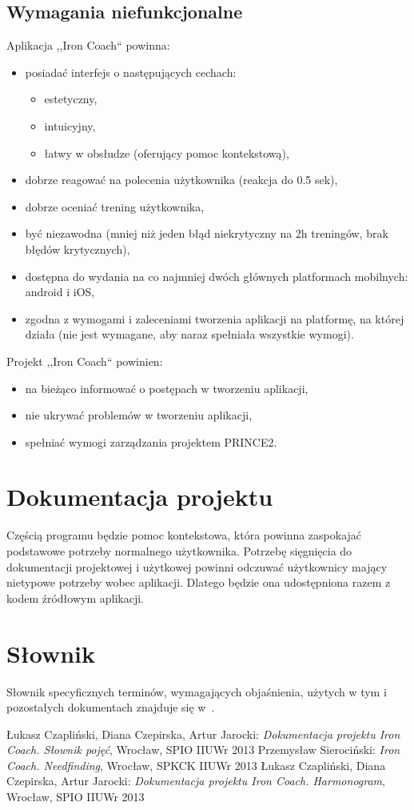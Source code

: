 \subsection{Wymagania niefunkcjonalne}
Aplikacja ,,Iron Coach`` powinna:
\begin{itemize}
  \item posiadać interfejs o następujących cechach:
    \begin{itemize}
      \item estetyczny,
      \item intuicyjny, 
      \item łatwy w obsłudze (oferujący pomoc kontekstową), 
    \end{itemize}
  \item dobrze reagować na polecenia użytkownika (reakcja do 0.5 sek),
  \item dobrze oceniać trening użytkownika,
  \item być niezawodna (mniej niż jeden błąd niekrytyczny na 2h treningów, brak błędów krytycznych),
  \item dostępna do wydania na co najmniej dwóch głównych platformach mobilnych: android i iOS,
  \item zgodna z wymogami i zaleceniami tworzenia aplikacji na platformę, na której działa (nie jest wymagane, aby naraz spełniała wszystkie wymogi).
\end{itemize}
Projekt ,,Iron Coach`` powinien:
\begin{itemize}
  \item na bieżąco informować o postępach w tworzeniu aplikacji,
  \item nie ukrywać problemów w tworzeniu aplikacji,
  \item spełniać wymogi zarządzania projektem PRINCE2.
\end{itemize}
\section{Dokumentacja projektu}
\noindent Częścią programu będzie pomoc kontekstowa, która powinna zaspokajać podstawowe potrzeby normalnego użytkownika. Potrzebę sięgnięcia do dokumentacji projektowej i użytkowej powinni odczuwać użytkownicy mający nietypowe potrzeby wobec aplikacji. Dlatego będzie ona udostępniona razem z kodem źródłowym aplikacji.
\section{Słownik}
\noindent Słownik specyficznych terminów, wymagających objaśnienia, użytych w tym i pozostałych dokumentach znajduje się w~\cite{Sł}.
\begin{thebibliography}{99}
   Łukasz Czapliński, Diana Czepirska, Artur Jarocki: {\it Dokumentacja projektu Iron Coach. Słownik pojęć}, Wrocław, SPIO IIUWr 2013
   Przemysław Sierociński: {\it Iron Coach. Needfinding}, Wrocław, SPKCK IIUWr 2013
   Łukasz Czapliński, Diana Czepirska, Artur Jarocki: {\it Dokumentacja projektu Iron Coach. Harmonogram}, Wrocław, SPIO IIUWr 2013
\end{thebibliography}


